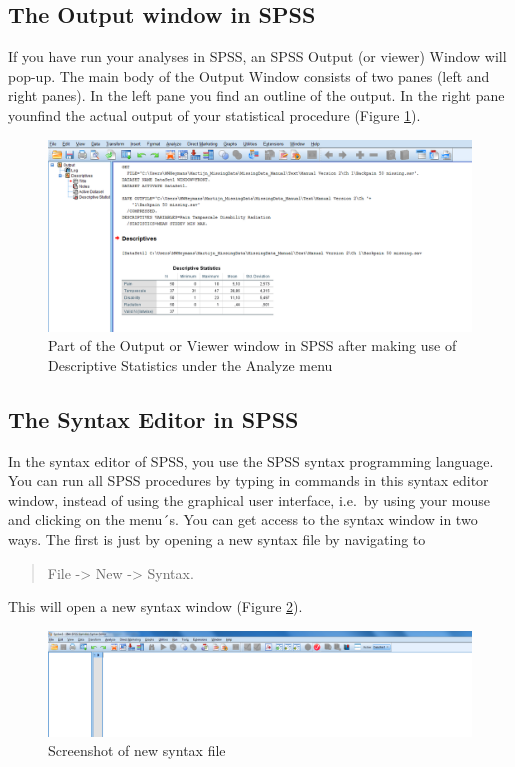 \documentclass[]{book}
\theoremstyle{definition}
\theoremstyle{definition}
\theoremstyle{definition}
\theoremstyle{remark}
\begin{document}
\subsection{The Output window in SPSS}\label{the-output-window-in-spss}

If you have run your analyses in SPSS, an SPSS Output (or viewer) Window
will pop-up. The main body of the Output Window consists of two panes
(left and right panes). In the left pane you find an outline of the
output. In the right pane younfind the actual output of your statistical
procedure (Figure \ref{fig:fig5}).

\begin{figure}

{\centering \includegraphics[width=0.8\linewidth]{images/fig1.5} 

}

\caption{Part of the Output or Viewer window in SPSS after making use of Descriptive Statistics under the Analyze menu}\label{fig:fig5}
\end{figure}

\subsection{The Syntax Editor in SPSS}\label{the-syntax-editor-in-spss}

In the syntax editor of SPSS, you use the SPSS syntax programming
language. You can run all SPSS procedures by typing in commands in this
syntax editor window, instead of using the graphical user interface,
i.e.~by using your mouse and clicking on the menu´s. You can get access
to the syntax window in two ways. The first is just by opening a new
syntax file by navigating to

\begin{quote}
File -\textgreater{} New -\textgreater{} Syntax.
\end{quote}

This will open a new syntax window (Figure \ref{fig:fig6}).

\begin{figure}

{\centering \includegraphics[width=0.8\linewidth]{images/fig1.6} 

}

\caption{Screenshot of new syntax file}\label{fig:fig6}
\end{figure}
\end{document}
